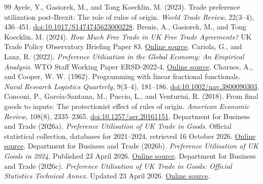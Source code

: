 \documentclass[11pt,a4paper]{article}
\begin{document}
\FloatBarrier
\begin{thebibliography}{99}
 Ayele, Y., Gasiorek, M., and Tong Koecklin, M. (2023). Trade preference utilization post-Brexit: The role of rules of origin. \emph{World Trade Review}, 22(3--4), 436--451. \href{https://doi.org/10.1017/S1474745623000228}{doi:10.1017/S1474745623000228}.
 Brenis, A., Gasiorek, M., and Tong Koecklin, M. (2024). \emph{How Much Free Trade in UK Free Trade Agreements?} UK Trade Policy Observatory Briefing Paper 83. \href{https://blogs.sussex.ac.uk/uktpo/publications/how-much-free-trade-in-uk-free-trade-agreements/}{Online source}.
 Cariola, G., and Lanz, R. (2022). \emph{Preference Utilization in the Global Economy: An Empirical Analysis}. WTO Staff Working Paper ERSD-2022-4. \href{https://www.wto.org/english/res_e/reser_e/ersd202204_e.pdf}{Online source}.
 Charnes, A., and Cooper, W. W. (1962). Programming with linear fractional functionals. \emph{Naval Research Logistics Quarterly}, 9(3--4), 181--186. \href{https://doi.org/10.1002/nav.3800090303}{doi:10.1002/nav.3800090303}.
 Conconi, P., Garc\'ia-Santana, M., Puccio, L., and Venturini, R. (2018). From final goods to inputs: The protectionist effect of rules of origin. \emph{American Economic Review}, 108(8), 2335--2365. \href{https://doi.org/10.1257/aer.20161151}{doi:10.1257/aer.20161151}.
 Department for Business and Trade (2026a). \emph{Preference Utilisation of UK Trade in Goods}. Official statistical collection, databases for 2021--2024, retrieved 16 October 2026. \href{https://www.gov.uk/government/collections/preference-utilisation-of-uk-trade-in-goods}{Online source}.
 Department for Business and Trade (2026b). \emph{Preference Utilisation of UK Goods in 2024}. Published 23 April 2026. \href{https://www.gov.uk/government/statistics/preference-utilisation-of-uk-trade-in-goods-2024/preference-utilisation-of-uk-goods-in-2024}{Online source}.
 Department for Business and Trade (2026c). \emph{Preference Utilisation of UK Trade in Goods: Official Statistics Technical Annex}. Updated 23 April 2026. \href{https://www.gov.uk/government/statistics/preference-utilisation-of-uk-trade-in-goods-technical-annex/preference-utilisation-of-uk-trade-in-goods-official-statistics-technical-annex}{Online source}.

\end{thebibliography}
\end{document}
